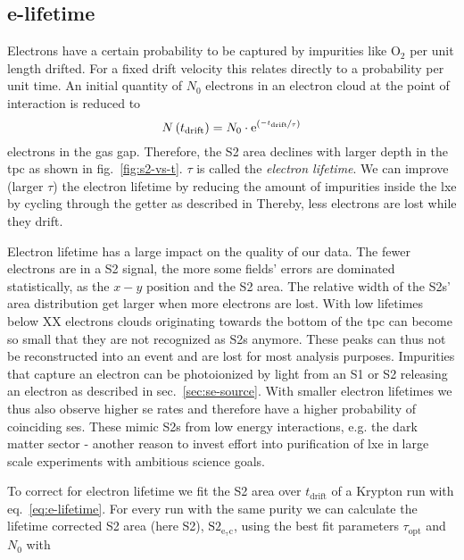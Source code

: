 
\FloatBarrier
\subsection{e-lifetime}
\label{ssec:e-lifetime}
\FloatBarrier


Electrons have a certain probability to be captured by impurities like $ \mathrm{O}_2 $ per unit length drifted.
For a fixed drift velocity this relates directly to a probability per unit time.
An initial quantity of $ N_0 $ electrons in an electron cloud at the point of interaction is reduced to
\begin{equation}
    N \left( t_\mathrm{drift} \right) = N_0 \cdot \mathrm{e}^{ \left( \nicefrac{-t_\mathrm{drift}}{\tau} \right)}
    \label{eq:e-lifetime}
\end{equation}
electrons in the gas gap.
Therefore, the S2 area declines with larger depth in the \gls{tpc} as shown in fig.~\ref{fig:s2-vs-t}.
$ \tau $ is called the \emph{electron lifetime}.
We can improve (larger $ \tau $) the electron lifetime by reducing the amount of impurities inside the \gls{lxe} by cycling through the getter as described in %
Thereby, less electrons are lost while they drift.

Electron lifetime has a large impact on the quality of our data.
The fewer electrons are in a S2 signal, the more some fields' errors are dominated statistically, as the $ x-y$ position and the S2 area.
The relative width of the S2s' area distribution get larger when more electrons are lost.
With low lifetimes below XX electrons clouds originating towards the bottom of the \gls{tpc} can become so small that they are not recognized as S2s anymore.  %
These peaks can thus not be reconstructed into an event and are lost for most analysis purposes.
Impurities that capture an electron can be photoionized by light from an S1 or S2 releasing an electron as described in sec.~\ref{sec:se-source}.  %
With smaller electron lifetimes we thus also observe higher \gls{se} rates and therefore have a higher probability of coinciding \glspl{se}.
These mimic S2s from low energy interactions, e.g. the dark matter sector - another reason to invest effort into purification of \gls{lxe} in large scale experiments with ambitious science goals.

To correct for electron lifetime we fit the S2 area over $ t_\mathrm{drift} $ of a Krypton run with eq.~\ref{eq:e-lifetime}.
For every run with the same purity we can calculate the lifetime corrected S2 area (here S2), $ \mathrm{S2_\mathrm{e_\tau c}} $, using the best fit parameters $ \tau_\mathrm{opt} $ and $ N_0 $ with

